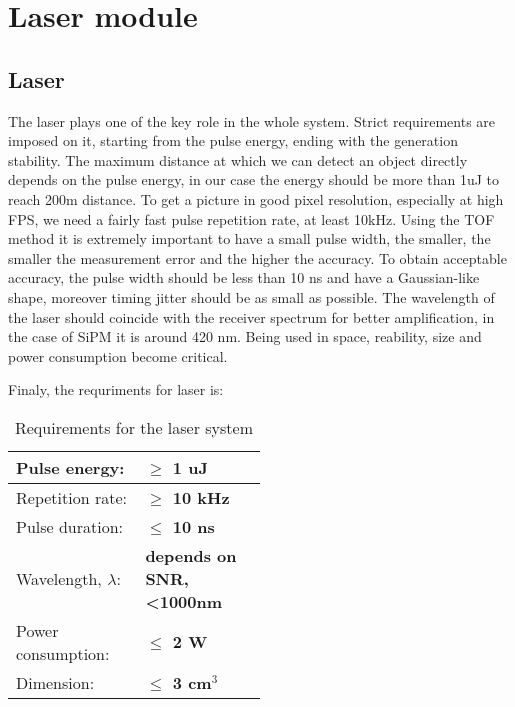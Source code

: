 \section{Laser module}

\subsection{Laser}
The laser plays one of the key role in the whole system.
Strict requirements are imposed on it, starting from the pulse energy, ending with the generation stability. 
The maximum distance at which we can detect an object directly depends on the pulse energy, in our case the energy should be more than 1uJ to reach 200m distance.
To get a picture in good pixel resolution, especially at high FPS, we need a fairly fast pulse repetition rate, at least 10kHz.
Using the TOF method it is extremely important to have a small pulse width, the smaller, the smaller the measurement error and the higher the accuracy.
To obtain acceptable accuracy, the pulse width should be less than 10 ns and have a Gaussian-like shape, moreover timing jitter should be as small as possible.
The wavelength of the laser should coincide with the receiver spectrum for better amplification, in the case of SiPM it is around 420 nm.
Being used in space, reability, size and power consumption become critical.

Finaly, the requriments for laser is: \\


\begin{table}[H]
\label{tbl:rfp_laser}
\begin{center}

\begin{tabular}{|p{0.2\linewidth}|p{0.3\linewidth}|}
\hline
Pulse energy: & \textbf{$\geq$ 1 uJ}  \\ \hline
Repetition rate: & \textbf{$\geq$ 10 kHz} \\\hline
Pulse duration: & \textbf{$\leq$ 10 ns} \\\hline
Wavelength, $\lambda$: & \textbf{depends on SNR, <1000nm} \\\hline
Power consumption: & \textbf{$\leq$ 2 W} \\  \hline
Dimension: & \textbf{$\leq$ 3 cm$^3$} \\  \hline
\end{tabular}
\caption{Requirements for the laser system}
\end{center}
\end{table}


